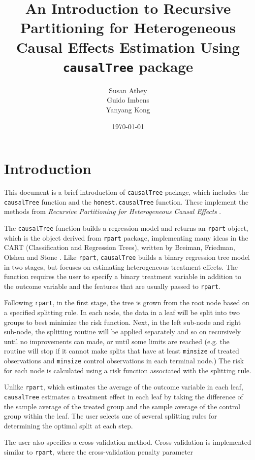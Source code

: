 \documentclass[11pt]{article}
\title {An Introduction to Recursive Partitioning for Heterogeneous Causal Effects Estimation Using \texttt{causalTree} package}
\author{Susan Athey \\
        Guido Imbens\\
        Yanyang Kong}
\date{\today}
\begin{document}

\maketitle
\tableofcontents

\section{Introduction}
This document is a brief introduction of \texttt{causalTree} package, which includes the \texttt{causalTree} function and the \texttt{honest.causalTree} function.  These implement the methods from \textit{Recursive Partitioning for Heterogeneous Causal Effects} \cite{athey2015machine}. \par 
The \texttt{causalTree} function builds a regression model and returns an \texttt{rpart} object, which is the object derived from \texttt{rpart} package, implementing many ideas in the CART (Classification and Regression Trees), written by Breiman, Friedman, Olshen and Stone \cite{Breiman83}. Like \texttt{rpart}, \texttt{causalTree} builds a binary regression tree model in two stages, but focuses on estimating heterogeneous treatment effects.  The function requires the user to specify a binary treatment variable in addition to the outcome variable and the
features that are usually passed to \texttt{rpart}.\par
Following \texttt{rpart}, in the first stage, the tree is grown from the root node based on a specified splitting rule. In each node, the data in a leaf will be split into two groups to best minimize the risk function. Next, in the left sub-node and right sub-node, the splitting routine will be applied separately and so on recursively until no improvements can made, or until some limits are reached (e.g. the routine will stop if it cannot make splits that have at least \texttt{minsize} of treated observations and \texttt{minsize} control observations in each terminal node.)
The risk for each node is calculated using a risk function associated with the splitting rule. \par
Unlike \texttt{rpart}, which estimates the average of the outcome variable in each leaf, \texttt{causalTree} estimates a treatment effect in each leaf by taking the difference
of the sample average of the treated group and the sample average of the control group within the leaf. The user selects one of several splitting rules for determining the optimal split
at each step.\par
The user also specifies a cross-validation method.  Cross-validation is implemented similar to \texttt{rpart}, where the cross-validation penalty parameter
\end{document}
